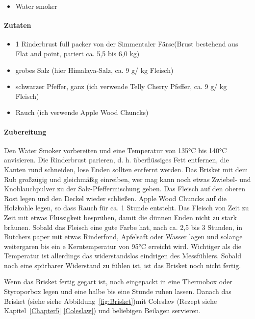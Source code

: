 \begin{itemize}[noitemsep]
	\item Water smoker
\end{itemize}

\paragraph{Zutaten}

\begin{itemize}[noitemsep]
	\item 1 Rinderbrust full packer von der Simmentaler Färse(Brust bestehend aus Flat and point, pariert ca. 5,5 bis 6,0 kg)
	\item grobes Salz (hier Himalaya-Salz, ca. 9 g/ kg Fleisch)
	\item schwarzer Pfeffer, ganz (ich verwende Telly Cherry Pfeffer, ca. 9 g/ kg Fleisch)
	\item Rauch (ich verwende Apple Wood Chuncks)	
\end{itemize}

\paragraph{Zubereitung}

Den Water Smoker vorbereiten und eine Temperatur von 135°C bis 140°C anvisieren.
Die Rinderbrust parieren, d. h. überflüssiges Fett entfernen, die Kanten rund schneiden, 
lose Enden sollten entfernt werden. Das Brisket mit dem Rub großzügig und gleichmäßig 
einreiben, wer mag kann noch etwas Zwiebel- und Knoblauchpulver zu der 
Salz-Pfeffermischung geben. Das Fleisch auf den oberen Rost legen und den Deckel 
wieder schließen. Apple Wood Chuncks auf die Holzkohle legen, so dass Rauch für ca. 1 
Stunde entsteht. Das Fleisch von Zeit zu Zeit mit etwas Flüssigkeit besprühen, damit die 
dünnen Enden nicht zu stark bräunen. Sobald das Fleisch eine gute Farbe hat, nach ca. 
2,5 bis 3 Stunden, in Butchers paper mit etwas Rinderfond, Apfelsaft oder Wasser lagen 
und solange weitergaren bis ein e Kerntemperatur von 95°C erreicht wird. Wichtiger als 
die Temperatur ist allerdings das widerstandslos eindrigen des Messfühlers. Sobald 
noch eine spürbarer Widerstand zu fühlen ist, ist das Brisket noch nicht fertig. 

Wenn das Brisket fertig gegart ist, noch eingepackt in eine Thermobox oder Styroporbox 
legen und eine halbe bis eine Stunde ruhen lassen. Danach das Brisket (siehe siehe Abbildung~\vref{fig:Brisket})mit Coleslaw
 (Rezept siehe Kapitel~\ref{Chapter5} \vref{Coleslaw}) und beliebigen Beilagen servieren.

